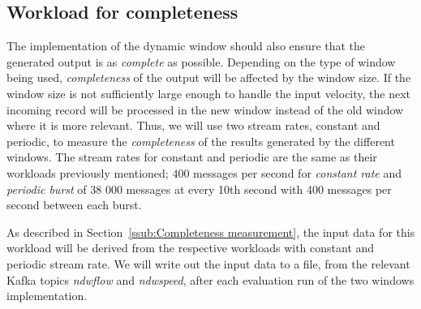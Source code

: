 \subsection{Workload for completeness}
The implementation of the dynamic window should also ensure that the generated 
output is as \emph{complete} as possible. 
Depending on the type of window being used, \emph{completeness} of the output will be
affected by the window size. If the window size is not sufficiently large enough to handle 
the input velocity, the next incoming record will be processed in the new window instead of 
the old window where it is more relevant. Thus, 
we will use two stream rates, constant and periodic, to measure the \emph{completeness} of the results generated 
by the different windows. The stream rates for constant and periodic are the same as their 
workloads previously mentioned; 400 messages per second for \emph{constant rate} and 
\emph{periodic burst} of 38 000 messages at every 10th second with 400 messages per second 
between each burst.

As described in Section~\ref{ssub:Completeness measurement}, 
the input data for this workload will be derived from the respective workloads with 
constant and periodic stream rate. We will write out the input data to a file, from the relevant Kafka 
topics \emph{ndwflow} and \emph{ndwspeed}, after each evaluation run of the two windows implementation. 





